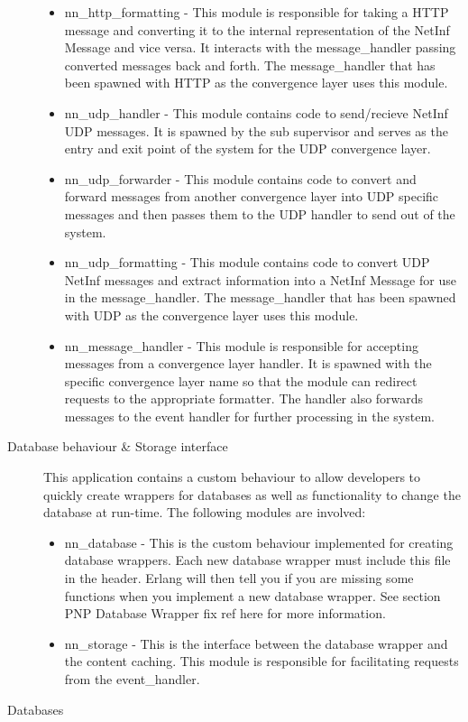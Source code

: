 \begin{description}
\begin{itemize}
\item nn\_http\_formatting - This module is responsible for taking a HTTP message and converting it to the internal representation of the NetInf Message and vice versa. It interacts with the message\_handler passing converted messages back and forth. The message\_handler that has been spawned with HTTP as the convergence layer uses this module.
\item nn\_udp\_handler - This module contains code to send/recieve NetInf UDP messages. It is spawned by the sub supervisor and serves as the entry and exit point of the system for the UDP convergence layer.
\item nn\_udp\_forwarder - This module contains code to convert and forward messages from another convergence layer into UDP specific messages and then passes them to the UDP handler to send out of the system.
\item nn\_udp\_formatting - This module contains code to convert UDP NetInf messages and extract information into a NetInf Message for use in the message\_handler. The message\_handler that has been spawned with UDP as the convergence layer uses this module.
\item nn\_message\_handler - This module is responsible for accepting messages from a convergence layer handler. It is spawned with the specific convergence layer name so that the module can redirect requests to the appropriate formatter. The handler also forwards messages to the event handler for further processing in the system.
\end{itemize}
\item[Database behaviour \& Storage interface]
This application contains a custom behaviour to allow developers to quickly create wrappers for databases as well as functionality to change the database at run-time. The following modules are involved:
\begin {itemize}
\item nn\_database - This is the custom behaviour implemented for creating database wrappers. Each new database wrapper must include this file in the header. Erlang will then tell you if you are missing some functions when you implement a new database wrapper. See section  PNP Database Wrapper {fix ref here} for more information.
\item nn\_storage - This is the interface between the database wrapper and the content caching. This module is responsible for facilitating requests from the event\_handler.
\end{itemize}
\item[Databases]

\end{description}
